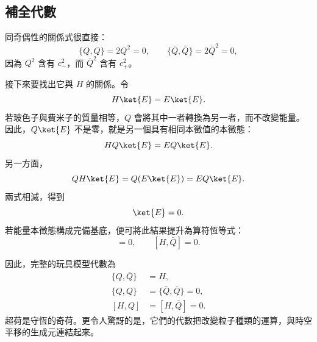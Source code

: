 \subsection{補全代數}

同奇偶性的關係式很直接：
\begin{equation}
\{Q,Q\}=2Q^2=0,
\qquad
\{\bar Q,\bar Q\}=2\bar Q^2=0,
\end{equation}
因為 \(Q^2\) 含有 \(c_-^2\)，而 \(\bar Q^2\) 含有 \(c_+^2\)。

接下來要找出它與 \(H\) 的關係。令
\begin{equation}
H\ket{E}=E\ket{E}.
\end{equation}
若玻色子與費米子的質量相等，\(Q\) 會將其中一者轉換為另一者，而不改變能量。因此，\(Q\ket{E}\) 不是零，就是另一個具有相同本徵值的本徵態：
\begin{equation}
H Q\ket{E}=E Q\ket{E}.
\end{equation}
另一方面，
\begin{equation}
QH\ket{E}=Q(E\ket{E})=E Q\ket{E}.
\end{equation}
兩式相減，得到
\begin{equation}
[H,Q]\ket{E}=0.
\end{equation}
若能量本徵態構成完備基底，便可將此結果提升為算符恆等式：
\begin{equation}
[H,Q]=0,
\qquad
[H,\bar Q]=0.
\end{equation}

\begin{classroomqa}
\end{classroomqa}

\begin{classroomqa}
\end{classroomqa}

因此，完整的玩具模型代數為
\begin{align}
\{Q,\bar Q\}&=H,\\
\{Q,Q\}&=\{\bar Q,\bar Q\}=0,\\
[H,Q]&=[H,\bar Q]=0.
\end{align}
超荷是守恆的奇荷。更令人驚訝的是，它們的代數把改變粒子種類的運算，與時空平移的生成元連結起來。

